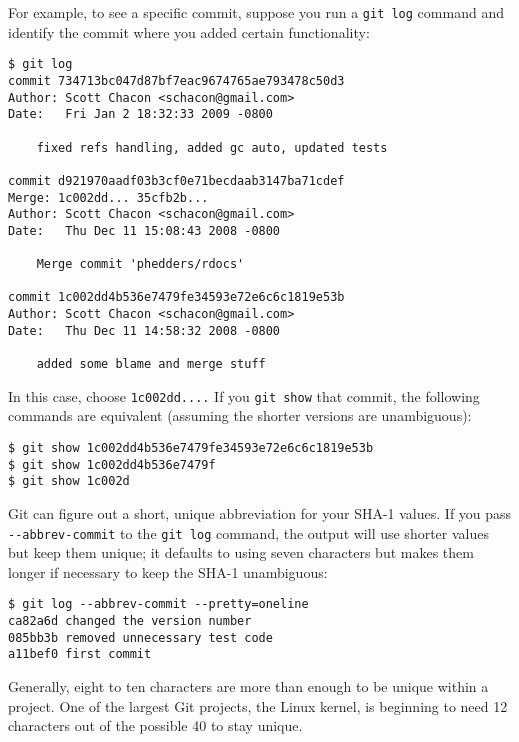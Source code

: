 \documentclass[a4paper]{book}
\begin{document}
For example, to see a specific commit, suppose you run a \texttt{git log} command and identify the commit where you added certain functionality:

\begin{shaded}\begin{verbatim}
$ git log
commit 734713bc047d87bf7eac9674765ae793478c50d3
Author: Scott Chacon <schacon@gmail.com>
Date:   Fri Jan 2 18:32:33 2009 -0800

    fixed refs handling, added gc auto, updated tests

commit d921970aadf03b3cf0e71becdaab3147ba71cdef
Merge: 1c002dd... 35cfb2b...
Author: Scott Chacon <schacon@gmail.com>
Date:   Thu Dec 11 15:08:43 2008 -0800

    Merge commit 'phedders/rdocs'

commit 1c002dd4b536e7479fe34593e72e6c6c1819e53b
Author: Scott Chacon <schacon@gmail.com>
Date:   Thu Dec 11 14:58:32 2008 -0800

    added some blame and merge stuff
\end{verbatim}\end{shaded}

In this case, choose \texttt{1c002dd....} If you \texttt{git show} that commit, the following commands are equivalent (assuming the shorter versions are unambiguous):

\begin{shaded}\begin{verbatim}
$ git show 1c002dd4b536e7479fe34593e72e6c6c1819e53b
$ git show 1c002dd4b536e7479f
$ git show 1c002d
\end{verbatim}\end{shaded}

Git can figure out a short, unique abbreviation for your SHA-1 values. If you pass \texttt{-{}-abbrev-commit} to the \texttt{git log} command, the output will use shorter values but keep them unique; it defaults to using seven characters but makes them longer if necessary to keep the SHA-1 unambiguous:

\begin{shaded}\begin{verbatim}
$ git log --abbrev-commit --pretty=oneline
ca82a6d changed the version number
085bb3b removed unnecessary test code
a11bef0 first commit
\end{verbatim}\end{shaded}

Generally, eight to ten characters are more than enough to be unique within a project. One of the largest Git projects, the Linux kernel, is beginning to need 12 characters out of the possible 40 to stay unique.
\end{document}
